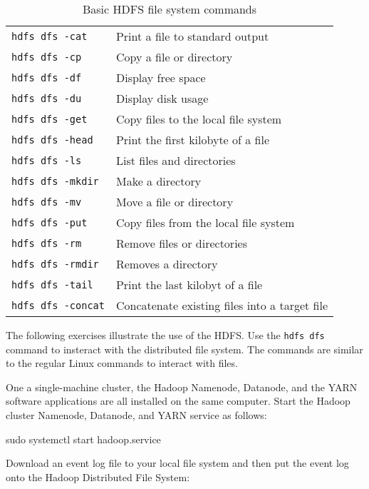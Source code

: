\begin{table}
\centering

\renewcommand{\arraystretch}{1.25}
\small
\begin{tabular}{l|l} \hline
\texttt{hdfs dfs -cat} & Print a file to standard output \\
\texttt{hdfs dfs -cp} & Copy a file or directory\\
\texttt{hdfs dfs -df} & Display free space \\
\texttt{hdfs dfs -du} & Display disk usage \\
\texttt{hdfs dfs -get} & Copy files to the local file system \\
\texttt{hdfs dfs -head} & Print the first kilobyte of a file \\
\texttt{hdfs dfs -ls} & List files and directories \\
\texttt{hdfs dfs -mkdir} & Make a directory \\
\texttt{hdfs dfs -mv} & Move a file or directory \\
\texttt{hdfs dfs -put} & Copy files from the local file system \\
\texttt{hdfs dfs -rm} & Remove files or directories \\
\texttt{hdfs dfs -rmdir} & Removes a directory \\
\texttt{hdfs dfs -tail} & Print the last kilobyt of a file \\
\texttt{hdfs dfs -concat} & Concatenate existing files into a target file \\ \hline
\end{tabular}
\caption{Basic HDFS file system commands}
\label{tab:hdfscommands}
\end{table}

The following exercises illustrate the use of the HDFS. Use the \texttt{hdfs dfs} command to insteract with the distributed file system. The commands are similar to the regular Linux commands to interact with files.

One a single-machine cluster, the Hadoop Namenode, Datanode, and the YARN software applications are all installed on the same computer. Start the Hadoop cluster Namenode, Datanode, and YARN service as follows:

\begin{bashcode}
sudo systemctl start hadoop.service
\end{bashcode}

Download an event log file to your local file system and then put the event log onto the Hadoop Distributed File System:

